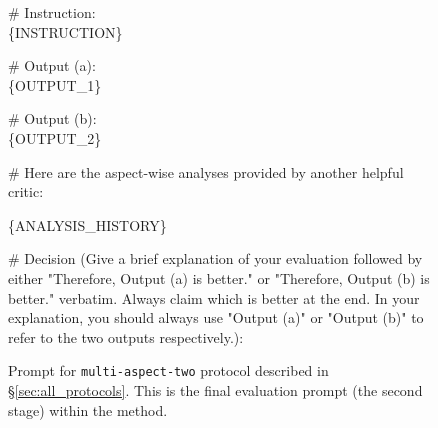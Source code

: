 \begin{figure*}[t!]
\begin{tcolorbox}[colback=black!3!white, colframe=black!70!white, title=Multi-aspect-two (final evaluation stage), fontupper=\footnotesize, fonttitle=\footnotesize]
\# Instruction: \\
\{INSTRUCTION\}
\newline

\# Output (a): \\
\{OUTPUT\_1\}
\newline

\# Output (b): \\
\{OUTPUT\_2\}
\newline

\# Here are the aspect-wise analyses provided by another helpful critic:

\{ANALYSIS\_HISTORY\}
\newline

\# Decision (Give a brief explanation of your evaluation followed by either "Therefore, Output (a) is better." or "Therefore, Output (b) is better." verbatim. Always claim which is better at the end. In your explanation, you should always use "Output (a)" or "Output (b)" to refer to the two outputs respectively.):
\end{tcolorbox}
\caption{Prompt for \texttt{multi-aspect-two} protocol described in \S\ref{sec:all_protocols}. This is the final evaluation prompt (the second stage) within the method.}
\label{fig:prompt_multi_aspect_two_final}
\end{figure*}




%
% 


